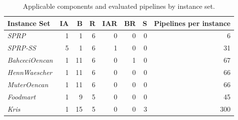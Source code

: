 \begin{table}[tbp]
\centering
\caption{Applicable components and evaluated pipelines by instance set.}
\label{tab:pipeline_results}
\small
\begin{tabular}{@{}lrrrrrrr@{}}
\toprule
Instance Set & IA & B & R & IAR & BR & S & Pipelines per instance \\
\midrule
\textit{SPRP} & 1 & 1 & 6 & 0 & 0 & 0 & 6 \\
\textit{SPRP-SS} & 5 & 1 & 6 & 1 & 0 & 0 & 31 \\
\textit{BahceciOencan} & 1 & 11 & 6 & 0 & 1 & 0 & 67 \\
\textit{HennWaescher} & 1 & 11 & 6 & 0 & 0 & 0 & 66 \\
\textit{MuterOencan} & 1 & 11 & 6 & 0 & 0 & 0 & 66 \\
\textit{Foodmart} & 1 & 9 & 5 & 0 & 0 & 0 & 45 \\
\textit{Kris} & 1 & 15 & 5 & 0 & 0 & 3 & 300 \\
\bottomrule
\end{tabular}
\end{table}
